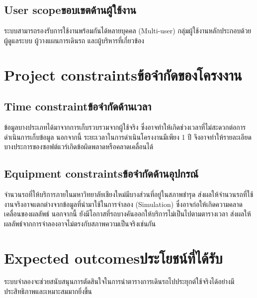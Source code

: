 \subsection{\ifenglish User scope\else ขอบเขตด้านผู้ใช้งาน\fi}
    \begin{mypara}
        \indent ระบบสามารถรองรับการใช้งานพร้อมกันได้หลายบุคคล (Multi-user) 
        กลุ่มผู้ใช้งานหลักประกอบด้วยผู้ดูแลระบบ ผู้วางแผนการเดินรถ และผู้บริหารที่เกี่ยวข้อง
    \end{mypara}

\section{\ifenglish Project constraints\else ข้อจำกัดของโครงงาน\fi}

\subsection{\ifenglish Time constraint\else ข้อจำกัดด้านเวลา\fi}
    \begin{mypara}
        \indent ข้อมูลบางประเภทได้มาจากการเก็บรวบรวมจากผู้ใช้จริง ซึ่งอาจทำให้เกิดช่วงเวลาที่ไม่สะดวกต่อการดำเนินการเก็บข้อมูล 
        นอกจากนี้ ระยะเวลาในการดำเนินโครงงานมีเพียง 1 ปี จึงอาจทำให้รายละเอียดบางประการของซอฟต์แวร์เกิดข้อผิดพลาดหรือคลาดเคลื่อนได้
    \end{mypara}
\subsection{\ifenglish Equipment constraints\else ข้อจำกัดด้านอุปกรณ์\fi}
    \begin{mypara}
        \indent จำนวนรถที่ให้บริการภายในมหาวิทยาลัยเชียงใหม่มีบางส่วนที่อยู่ในสภาพชำรุด 
        ส่งผลให้จำนวนรถที่ใช้งานจริงอาจแตกต่างจากข้อมูลที่นำมาใช้ในการจำลอง (Simulation) 
        ซึ่งอาจก่อให้เกิดความคลาดเคลื่อนของผลลัพธ์ นอกจากนี้ ยังมีโอกาสที่รถบางคันออกให้บริการไม่เป็นไปตามตารางเวลา 
        ส่งผลให้ผลลัพธ์จากการจำลองอาจไม่ตรงกับสภาพความเป็นจริงเช่นกัน
    \end{mypara}

\section{\ifenglish Expected outcomes\else ประโยชน์ที่ได้รับ\fi}
    \begin{mypara}
        \indent ระบบจำลองจะช่วยสนับสนุนการตัดสินใจในการนำตารางการเดินรถไปประยุกต์ใช้จริงได้อย่างมีประสิทธิภาพและเหมาะสมมากยิ่งขึ้น
    \end{mypara}
